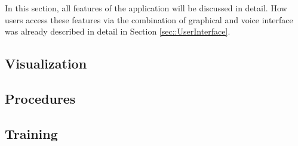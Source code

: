 In this section, all features of the application will be discussed in detail.
How users access these features via the combination of graphical and voice interface was already described in detail in Section \ref{sec::UserInterface}.

\subsection{\label{sec::ImplementationVisualization}Visualization}

\subsection{\label{sec::ImplementationProcedures}Procedures}

\subsection{\label{sec::ImplementationTraining}Training}
